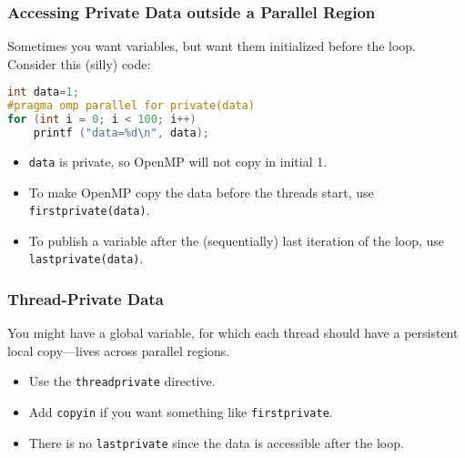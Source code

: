 \documentclass[aspectratio=43]{beamer}
\newenvironment{changemargin}[1]{%
  \begin{list}{}{%
    \setlength{\topsep}{0pt}%
    \setlength{\leftmargin}{#1}%
    \setlength{\rightmargin}{1em}
    \setlength{\listparindent}{\parindent}%
    \setlength{\itemindent}{\parindent}%
    \setlength{\parsep}{\parskip}%
  }%
  \item[]}{\end{list}}
\begin{document}
\begin{frame}[fragile]
  \frametitle{Accessing Private Data outside a Parallel Region}

  \begin{changemargin}{2cm}
Sometimes you want  variables, but want them initialized
before the loop.\\[1em]

Consider this (silly) code:

\begin{lstlisting}[language=C]
int data=1;
#pragma omp parallel for private(data)
for (int i = 0; i < 100; i++)
    printf ("data=%d\n", data);
\end{lstlisting}


\begin{itemize}
  \item {\tt data} is private, so OpenMP will not copy in initial 1.
  \item To make OpenMP copy the data before the threads start, use
    {\tt firstprivate(data)}.
  \item To publish a variable after the (sequentially) last iteration of the loop, use
    {\tt lastprivate(data)}.
\end{itemize}
  \end{changemargin}

\end{frame}

\begin{frame}
  \frametitle{Thread-Private Data}

  \begin{changemargin}{1.5cm}

    You might have a global variable, for which each thread should have a persistent local copy---lives across parallel regions.\\[1em]
  \begin{itemize}
    \item Use the {\tt threadprivate} directive.
    \item Add {\tt copyin} if you want something like
      {\tt firstprivate}.
    \item There is no {\tt lastprivate} since the data is accessible after the
      loop.
  \end{itemize}
  \end{changemargin}

\end{frame}
\end{document}
